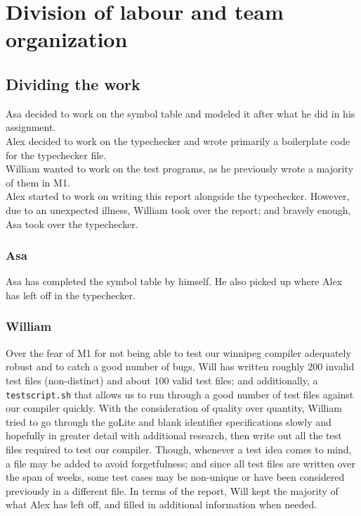 \documentclass{article}
\begin{document}
\section{Division of labour and team organization}

\subsection{Dividing the work}


 Asa decided to work on the symbol table and modeled it after what he did in his assignment. \\
 Alex decided to work on the typechecker and wrote primarily a boilerplate code for the typechecker file. \\
 William wanted to work on the test programs, as he previously wrote a majority of them in M1. \\
 Alex started to work on writing this report alongside the typechecker. However, due to an unexpected illness, William took over the report; and bravely enough, Asa took over the typechecker.

\subsubsection{Asa}

Asa has completed the symbol table by himself. He also picked up where Alex has left off in the typechecker. 

\subsubsection{William}

Over the fear of M1 for not being able to test our winnipeg compiler adequately robust and to catch a good number of bugs, Will has written roughly 200 invalid test files (non-distinct) and about 100 valid test files; and additionally, a \verb|testscript.sh| that allows us to run through a good number of test files against our compiler quickly. With the consideration of quality over quantity, William tried to go through the goLite and blank identifier specifications slowly and hopefully in greater detail with additional research, then write out all the test files required to test our compiler. Though, whenever a test idea comes to mind, a file may be added to avoid forgetfulness; and since all test files are written over the span of weeks, some test cases may be non-unique or have been considered previously in a different file. In terms of the report, Will kept the majority of what Alex has left off, and filled in additional information when needed.
\end{document}
